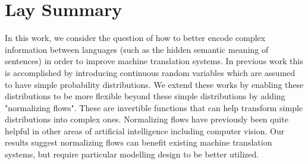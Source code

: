 

\chapter{Lay Summary}

In this work, we consider the question of how to better encode complex information between languages (such as the hidden semantic meaning of sentences) in order to improve machine translation systems. In previous work this is accomplished by introducing continuous random variables which are assumed to have simple probability distributions. We extend these works by enabling these distributions to be more flexible beyond these simple distributions by adding "normalizing flows". These are invertible functions that can help transform simple distributions into complex ones. Normalizing flows have previously been quite helpful in other areas of artificial intelligence including computer vision. Our results suggest normalizing flows can benefit existing machine translation systems, but require particular modelling design to be better utilized. 

